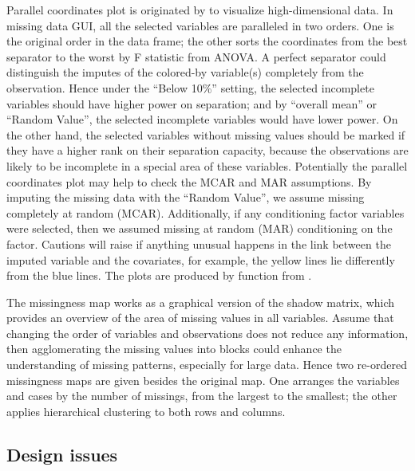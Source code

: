 \documentclass[article]{jss}
\begin{document}
Parallel coordinates plot is originated by \citet{inselberg1985plane} to visualize high-dimensional data. In missing data GUI, all the selected variables are paralleled in two orders. One is the original order in the data frame; the other sorts the coordinates from the best separator to the worst by F statistic from ANOVA. A perfect separator could distinguish the imputes of the colored-by variable(s) completely from the observation. Hence under the ``Below 10\%'' setting, the selected incomplete variables should have higher power on separation; and by ``overall mean'' or ``Random Value'', the selected incomplete variables would have lower power. On the other hand, the selected variables without missing values should be marked if they have a higher rank on their separation capacity, because the observations are likely to be incomplete in a special area of these variables. Potentially the parallel coordinates plot may help to check the MCAR and MAR assumptions. By imputing the missing data with the ``Random Value'', we assume missing completely at random (MCAR). Additionally, if any conditioning factor variables were selected, then we assumed missing at random (MAR) conditioning on the factor. Cautions will raise if anything unusual happens in the link between the imputed variable and the covariates, for example, the yellow lines lie differently from the blue lines. The plots are produced by function  from .

The missingness map works as a graphical version of the shadow matrix, which provides an overview of the area of missing values in all variables. Assume that changing the order of variables and observations does not reduce any information, then agglomerating the missing values into blocks could enhance the understanding of missing patterns, especially for large data. Hence two re-ordered missingness maps are given besides the original map. One arranges the variables and cases by the number of missings, from the largest to the smallest; the other applies hierarchical clustering to both rows and columns.


\subsection{Design issues}
\end{document}
